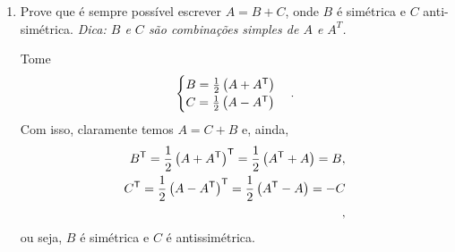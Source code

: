 \documentclass[leqno]{article}
\numberwithin{equation}{section}
\begin{document}
\begin{enumerate}
\begin{enumerate}
                \end{enumerate}

            \item Prove que é sempre possível escrever $A = B + C$, onde $B$ é simétrica e $C$ anti-simétrica. \textit{Dica: $B$ e $C$ são combinações simples de $A$ e $A^T$.}

                \begin{sol} 
                    Tome
                    \begin{equation*}
                        \begin{cases}
                            B = \frac{ 1 }{ 2 } \left(
                                A + A^{ \mathsf{T} }
                            \right) \\
                            C = \frac{ 1 }{ 2 } \left(
                                A - A^{ \mathsf{T} }
                            \right)
                        \end{cases}
                    .\end{equation*}
                    Com isso, claramente temos \( A = C + B \) e, ainda,
                    \begin{align*}
                        B^{ \mathsf{T} } =
                        \frac{ 1 }{ 2 }
                        \left(
                            A + A^{ \mathsf{T} }
                        \right)^{ \mathsf{T} }
                        = 
                        \frac{ 1 }{ 2 }
                        \left(
                            A^{ \mathsf{T} } + A
                        \right)
                        = B, \\
                        C^{ \mathsf{T} } =
                        \frac{ 1 }{ 2 }
                        \left(
                            A - A^{ \mathsf{T} }
                        \right)^{ \mathsf{T} }
                        = 
                        \frac{ 1 }{ 2 }
                        \left(
                            A^{ \mathsf{T} } - A
                        \right)
                        = -C \\
                    ,\end{align*}
                    ou seja, \( B \) é simétrica e \( C \) é antissimétrica.
                \end{sol} 


\end{enumerate}
\end{document}
